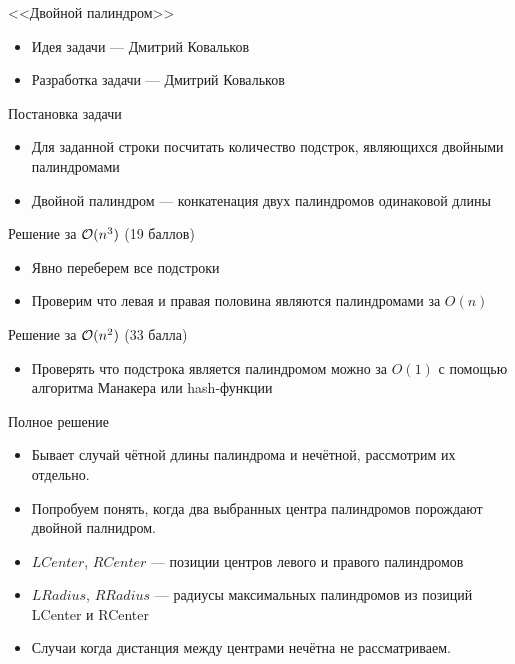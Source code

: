 \begin{frame}
  \begin{center}
    \LARGE <<Двойной палиндром>>
  \end{center}

  \begin{itemize}
  \item Идея задачи --- Дмитрий Ковальков
  \item Разработка задачи --- Дмитрий Ковальков
  \end{itemize}

\end{frame}

\begin{frame}{Постановка задачи}

  \begin{itemize}
  \item Для заданной строки посчитать количество подстрок, являющихся двойными палиндромами
  \item Двойной палиндром --- конкатенация двух палиндромов одинаковой длины
  \end{itemize}
  
\end{frame}

\begin{frame}{Решение за $\mathcal{O}(n^3)$ (19 баллов)}
  \begin{itemize}
  \item Явно переберем все подстроки
  \item Проверим что левая и правая половина являются палиндромами за $O(n)$
  \end{itemize}
\end{frame}

\begin{frame}{Решение за $\mathcal{O}(n^2)$ (33 балла)}
  \begin{itemize}
  \item Проверять что подстрока является палиндромом можно за $O(1)$ с помощью алгоритма Манакера или hash-функции
  \end{itemize}
\end{frame}

\begin{frame}{Полное решение}
  \begin{itemize}
  \item Бывает случай чётной длины палиндрома и нечётной, рассмотрим их отдельно.
  \item Попробуем понять, когда два выбранных центра палиндромов порождают двойной палнидром.
  \item $LCenter$, $RCenter$ --- позиции центров левого и правого палиндромов
  \item $LRadius$, $RRadius$ --- радиусы максимальных палиндромов из позиций LCenter и RCenter
  \item Случаи когда дистанция между центрами нечётна не рассматриваем.
  \end{itemize}
\end{frame}

